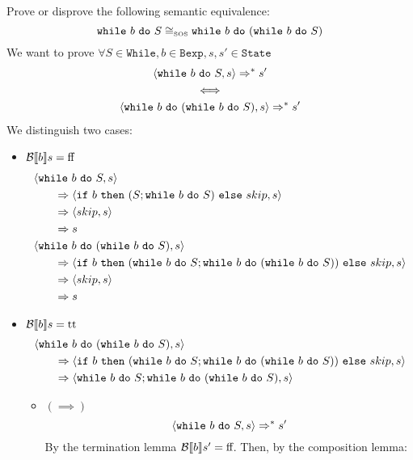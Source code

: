\begin{exercise}{
    Prove or disprove the following semantic equivalence:
    \[ \texttt{while}\ b\ \texttt{do}\ S \cong_{\text{\tiny SOS}} \texttt{while}\ b\ \texttt{do}\ (\texttt{while}\ b\ \texttt{do}\ S)  \]\vspace*{-0.6cm}
}
    We want to prove $\forall S \in \texttt{While}, b \in \texttt{Bexp}, s, s' \in \texttt{State}$
    \begin{gather*}
        \left<\texttt{while}\ b\ \texttt{do}\ S, s\right> \Rightarrow^* s' \\
        \iff \\
        \left<\texttt{while}\ b\ \texttt{do}\ (\texttt{while}\ b\ \texttt{do}\ S), s\right> \Rightarrow^* s'
    \end{gather*}
    We distinguish two cases:
    \begin{itemize}
        \item $\mathcal{B} \llbracket b \rrbracket s = \text{ff}$
            \begin{align*}
                &\left<\texttt{while}\ b\ \texttt{do}\ S, s\right>
                \\&\qquad\Rightarrow \left<\texttt{if}\ b\ \texttt{then}\ (S; \texttt{while}\ b\ \texttt{do}\ S)\ \texttt{else}\ skip, s\right>
                \\&\qquad\Rightarrow \left<skip, s\right>
                \\&\qquad\Rightarrow s
                \\
                &\left<\texttt{while}\ b\ \texttt{do}\ (\texttt{while}\ b\ \texttt{do}\ S), s\right>
                \\&\qquad\Rightarrow \left<\texttt{if}\ b\ \texttt{then}\ (\texttt{while}\ b\ \texttt{do}\ S; \texttt{while}\ b\ \texttt{do}\ (\texttt{while}\ b\ \texttt{do}\ S))\ \texttt{else}\ skip, s\right>
                \\&\qquad\Rightarrow \left<skip, s\right>
                \\&\qquad\Rightarrow s
            \end{align*}
        \item $\mathcal{B} \llbracket b \rrbracket s = \text{tt}$
            \begin{align*}
                &\left<\texttt{while}\ b\ \texttt{do}\ (\texttt{while}\ b\ \texttt{do}\ S), s\right>
                \\&\qquad\Rightarrow \left<\texttt{if}\ b\ \texttt{then}\ (\texttt{while}\ b\ \texttt{do}\ S; \texttt{while}\ b\ \texttt{do}\ (\texttt{while}\ b\ \texttt{do}\ S))\ \texttt{else}\ skip, s\right>
                \\&\qquad\Rightarrow \left<\texttt{while}\ b\ \texttt{do}\ S; \texttt{while}\ b\ \texttt{do}\ (\texttt{while}\ b\ \texttt{do}\ S), s\right>
            \end{align*}
            \begin{itemize}
                \item $(\implies)$
                    \[ \left<\texttt{while}\ b\ \texttt{do}\ S, s\right> \Rightarrow^* s' \]
                    By the termination lemma $\mathcal{B} \llbracket b \rrbracket s' = \text{ff}$. Then, by the composition lemma:

\end{itemize}
\end{itemize}
\end{exercise}
